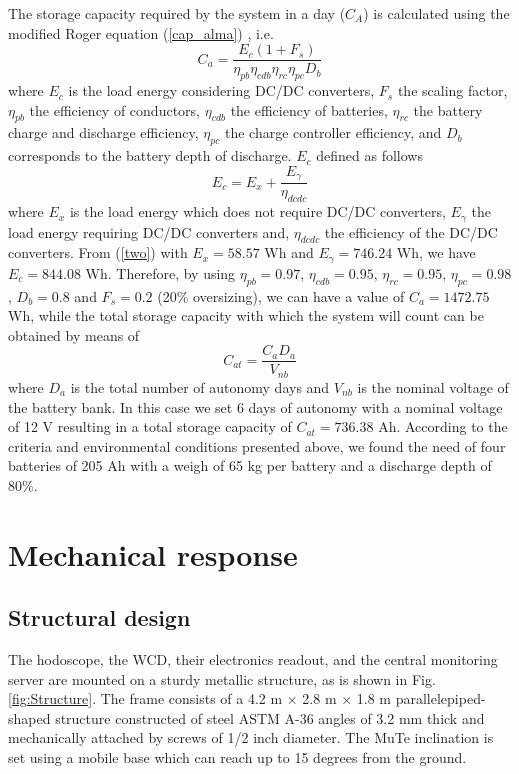 \documentclass[letterpaper,11pt]{article}
\begin{document}
The storage capacity required by the system in a day ($C_A$) is calculated using the modified Roger equation (\ref{cap_alma}) \cite{messenger2017photovoltaic}, i.e. 
\begin{equation}
C_a=\frac{E_c(1+F_s)}{\eta_{pb}\eta_{cdb}\eta_{rc}\eta_{pc}D_{b}} \label{cap_alma}
\end{equation}
where $E_c$ is the load energy considering DC/DC converters, $F_s$ the scaling factor, $\eta_{pb}$ the efficiency of conductors, $\eta_{cdb}$ the efficiency of batteries, $\eta_{rc}$ the battery charge and discharge efficiency, $\eta_{pc}$ the charge controller efficiency, and $D_{b}$ corresponds to the battery depth of discharge. $E_c$ defined as follows
\begin{equation}
E_c=E_x+\frac{E_{\gamma}}{\eta_{dcdc}}
\label{two}
\end{equation}
where $E_{x}$ is the load energy which does not require DC/DC converters, $E_{\gamma}$ the load energy requiring DC/DC converters and, $\eta_{dcdc}$ the efficiency of the DC/DC converters. From (\ref{two}) with $E_{x}=58.57$ Wh and $E_{\gamma}=746.24$ Wh, we have $E_c=844.08$ Wh. Therefore, by using $\eta_{pb}=0.97$, $\eta_{cdb}=0.95$, $\eta_{rc}=0.95$, $\eta_{pc}=0.98$, $D_{b}=0.8$ and $F_s=0.2$ (20\% oversizing), we can have a value of $C_a=1472.75$ Wh, while the total storage capacity with which the system will count can be obtained by means of
\begin{equation}
C_{at}=\frac{C_aD_a}{V_{nb}}
\end{equation}
where $D_a$ is the total number of autonomy days and $V_{nb}$ is the nominal voltage of the battery bank. In this case we set 6 days of autonomy with a nominal voltage of 12 V resulting in a total storage capacity of $C_{at}=736.38$ Ah. According to the criteria and environmental conditions presented above, we found the need of four batteries of 205 Ah with a weigh of 65 kg per battery and a discharge depth of 80\%.

\section{Mechanical response}
\label{mechanical}
\subsection{Structural design}
The hodoscope, the WCD, their electronics readout, and the central monitoring server are mounted on a sturdy metallic structure, as is shown in Fig. \ref{fig:Structure}. The frame consists of a 4.2 m $\times$ 2.8 m $\times$ 1.8 m parallelepiped-shaped structure constructed of steel ASTM A-36 angles of 3.2 mm thick and mechanically attached by screws of 1/2 inch diameter. The MuTe inclination is set using a mobile base which can reach up to 15 degrees from the ground.
\end{document}

